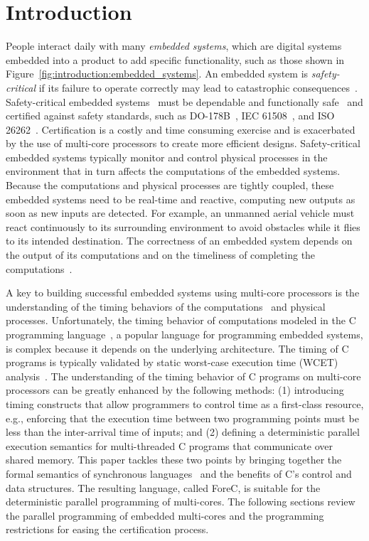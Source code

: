 \section{Introduction}
\label{sec:introduction}
People interact daily with many \emph{embedded systems}, 
which are digital systems embedded into a product to add
specific functionality, such as those shown in 
Figure~\ref{fig:introduction:embedded_systems}.
An embedded system is \emph{safety-critical} 
if its failure to operate correctly may lead to catastrophic 
consequences~\cite{AlemzadehIKR13}.
Safety-critical embedded systems~\cite{safety_critical_challenges_directions} 
must be dependable and functionally safe~\cite{BujaM12,safety_critical_tacmu,Dunn03}
and certified against safety standards, such as 
DO-178B~\cite{DO-178B}, IEC 61508~\cite{IEC61508}, and ISO 26262~\cite{ISO26262}. 
Certification is a costly and time consuming exercise 
and is exacerbated by the use of multi-core processors
to create more efficient designs.
Safety-critical embedded systems typically 
monitor and control physical processes in the environment 
that in turn affects the computations of the embedded systems.
Because the computations and physical processes are tightly coupled,
these embedded systems need to be real-time and reactive,
computing new outputs as soon as new inputs are detected. 
For example, an unmanned aerial vehicle must 
react continuously to its surrounding environment to avoid
obstacles while it flies to its intended destination. 
The correctness of an embedded system depends on the
output of its computations and on the timeliness of
completing the computations~\cite{Lee09,Wilhelm14}.

A key to building successful embedded systems using
multi-core processors is the
understanding of the timing behaviors of the
computations~\cite{AxerEFGGGJMRRSHWY14} and physical
processes. Unfortunately, the timing behavior of
computations modeled in the C programming
language~\cite{programming_languages_c11}, a popular
language for programming embedded systems, is complex
because it depends on the underlying architecture. 
The timing of C programs is typically validated 
by static worst-case execution time (WCET) 
analysis~\cite{Wilhelm14}. The understanding of the
timing behavior of C programs on multi-core processors 
can be greatly enhanced by the following methods: (1) 
introducing timing constructs that allow programmers to control 
time as a first-class resource, e.g., enforcing that the
execution time between two programming points must be less
than the inter-arrival time of inputs; and (2) defining 
a deterministic parallel execution semantics for multi-threaded 
C programs that communicate over shared memory. This paper
tackles these two points by bringing together the 
formal semantics of synchronous languages~\cite{timed_synchronous_survey}
and the benefits of C's control and data structures. The
resulting language, called ForeC, is suitable for the deterministic 
parallel programming of multi-cores.
The following sections review the parallel 
programming of embedded multi-cores and the programming restrictions 
for easing the certification process.

